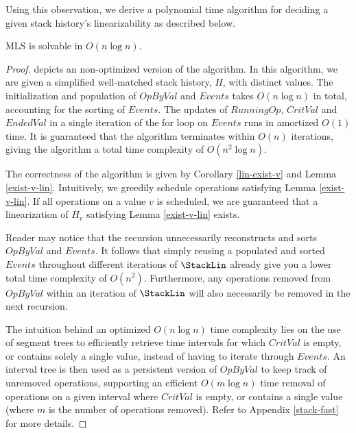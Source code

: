 Using this observation, we derive a polynomial time algorithm for deciding a given stack history's linearizability as described below.



\begin{theorem}\label{mls-dist}
    MLS is solvable in $O(n\log{n})$.
\end{theorem}
\begin{proof}
 depicts an non-optimized version of the algorithm. In this algorithm, we are given a simplified well-matched stack history, $H$, with distinct values. The initialization and population of $OpByVal$ and $Events$ takes $O(n \log{n})$ in total, accounting for the sorting of $Events$. The updates of $RunningOp$, $CritVal$ and $EndedVal$ in a single iteration of the for loop on $Events$ runs in amortized $O(1)$ time. It is guaranteed that the algorithm terminates within $O(n)$ iterations, giving the algorithm a total time complexity of $O(n^2 \log{n})$.

The correctness of the algorithm is given by Corollary \ref{lin-exist-v} and Lemma \ref{exist-v-lin}.
Intuitively, we greedily schedule operations satisfying Lemma \ref{exist-v-lin}. If all operations on a value $v$ is scheduled, we are guaranteed that a linearization of $H_v$ satisfying Lemma \ref{exist-v-lin} exists.

Reader may notice that the recursion unnecessarily reconstructs and sorts $OpByVal$ and $Events$. It follows that simply reusing a populated and sorted $Events$ throughout different iterations of $\StackLin$ already give you a lower total time complexity of $O(n^2)$. Furthermore, any operations removed from $OpByVal$ within an iteration of $\StackLin$ will also necessarily be removed in the next recursion. 

The intuition behind an optimized $O(n\log{n})$ time complexity lies on the use of segment trees to efficiently retrieve time intervals for which $CritVal$ is empty, or contains solely a single value, instead of having to iterate through $Events$. An interval tree is then used as a persistent version of $OpByVal$ to keep track of unremoved operations, supporting an efficient $O(m\log{n})$ time removal of operations on a given interval where $CritVal$ is empty, or contains a single value (where $m$ is the number of operations removed). Refer to Appendix \ref{stack-fast} for more details.
\end{proof}